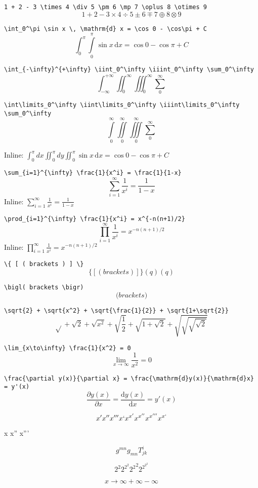 \documentclass{article}
\begin{document}
\verb|1 + 2 - 3 \times 4 \div 5 \pm 6 \mp 7 \oplus 8 \otimes 9|
\[ 1 + 2 - 3 \times 4 \div 5 \pm 6 \mp 7 \oplus 8 \otimes 9 \]

\verb|\int_0^\pi \sin x \, \mathrm{d} x = \cos 0 - \cos\pi + C|
\[ \int_0^\pi \int\limits_0^\pi \sin x \, \mathrm{d} x = \cos 0 - \cos\pi + C \]

\verb|\int_{-\infty}^{+\infty} \iint_0^\infty \iiint_0^\infty \sum_0^\infty|
\[ \int_{-\infty}^{+\infty} \iint_0^\infty \iiint_0^\infty \sum_0^\infty \]

\verb|\int\limits_0^\infty \iint\limits_0^\infty \iiint\limits_0^\infty \sum_0^\infty|
\[ \int\limits_0^\infty \iint\limits_0^\infty \iiint\limits_0^\infty \sum_0^\infty \]

Inline: $\int_0^\pi dx \iint_0^\pi dy \iint_0^\pi \sin x \, \mathrm{d} x = \cos 0 - \cos\pi + C$

\verb|\sum_{i=1}^{\infty} \frac{1}{x^i} = \frac{1}{1-x}|
\[ \sum_{i=1}^{\infty} \frac{1}{x^i} = \frac{1}{1-x} \]
Inline: $\sum_{i=1}^{\infty} \frac{1}{x^i} = \frac{1}{1-x}$

\verb|\prod_{i=1}^{\infty} \frac{1}{x^i} = x^{-n(n+1)/2}|
\[ \prod_{i=1}^{\infty} \frac{1}{x^i} = x^{-n(n+1)/2} \]
Inline: $\prod_{i=1}^{\infty} \frac{1}{x^i} = x^{-n(n+1)/2}$

\verb|\{ [ ( brackets ) ] \}|
\[ \{ [ ( brackets ) ] \} (q) \left( q \right) \]

\verb|\bigl( brackets \bigr)|
\[ \bigl( brackets \bigr) \]

\verb|\sqrt{2} + \sqrt{x^2} + \sqrt{\frac{1}{2}} + \sqrt{1+\sqrt{2}}|
\[ \sqrt{} + \sqrt{2} + \sqrt{x^2} + \sqrt{\frac{1}{2}} + \sqrt{1+\sqrt{2}} + \sqrt{\sqrt{\sqrt{\sqrt{2}}}} \]

\verb|\lim_{x\to\infty} \frac{1}{x^2} = 0|
\[ \lim_{x\to\infty} \frac{1}{x^2} = 0 \]

\verb|\frac{\partial y(x)}{\partial x} = \frac{\mathrm{d}y(x)}{\mathrm{d}x} = y'(x)|
\[ \frac{\partial y(x)}{\partial x} = \frac{\mathrm{d}y(x)}{\mathrm{d}x} = y'(x) \]

\[ x' x'' x''' x` x^{x'} x^{x''} x^{x'''} x^{x`}\]

{\firatext x x'' x'''}


\[ g^{mn} g_{mn} T^{i}_{jk} \]

\[ 2^2 2^{2^2} {2^2}^2 2^{2^{2^2}} \]

\[ x \to \infty + \infty - \infty \]
\end{document}
